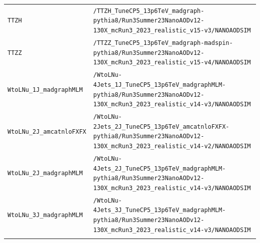 \begin{longtable}{@{}>{\RaggedRight\arraybackslash}p{} >{\RaggedRight\arraybackslash}p{}@{}}
\addlinespace[2pt]
\texttt{TTZH} & \texttt{/\allowbreak{}TTZH\_\allowbreak{}TuneCP5\_\allowbreak{}13p6TeV\_\allowbreak{}madgraph-\allowbreak{}pythia8/\allowbreak{}Run3Summer23NanoAODv12-\allowbreak{}130X\_\allowbreak{}mcRun3\_\allowbreak{}2023\_\allowbreak{}realistic\_\allowbreak{}v15-\allowbreak{}v3/\allowbreak{}NANOAODSIM} \\
\addlinespace[2pt]
\texttt{TTZZ} & \texttt{/\allowbreak{}TTZZ\_\allowbreak{}TuneCP5\_\allowbreak{}13p6TeV\_\allowbreak{}madgraph-\allowbreak{}madspin-\allowbreak{}pythia8/\allowbreak{}Run3Summer23NanoAODv12-\allowbreak{}130X\_\allowbreak{}mcRun3\_\allowbreak{}2023\_\allowbreak{}realistic\_\allowbreak{}v15-\allowbreak{}v4/\allowbreak{}NANOAODSIM} \\
\addlinespace[2pt]
\texttt{WtoLNu\_\allowbreak{}1J\_\allowbreak{}madgraphMLM} & \texttt{/\allowbreak{}WtoLNu-\allowbreak{}4Jets\_\allowbreak{}1J\_\allowbreak{}TuneCP5\_\allowbreak{}13p6TeV\_\allowbreak{}madgraphMLM-\allowbreak{}pythia8/\allowbreak{}Run3Summer23NanoAODv12-\allowbreak{}130X\_\allowbreak{}mcRun3\_\allowbreak{}2023\_\allowbreak{}realistic\_\allowbreak{}v14-\allowbreak{}v3/\allowbreak{}NANOAODSIM} \\
\addlinespace[2pt]
\texttt{WtoLNu\_\allowbreak{}2J\_\allowbreak{}amcatnloFXFX} & \texttt{/\allowbreak{}WtoLNu-\allowbreak{}2Jets\_\allowbreak{}2J\_\allowbreak{}TuneCP5\_\allowbreak{}13p6TeV\_\allowbreak{}amcatnloFXFX-\allowbreak{}pythia8/\allowbreak{}Run3Summer23NanoAODv12-\allowbreak{}130X\_\allowbreak{}mcRun3\_\allowbreak{}2023\_\allowbreak{}realistic\_\allowbreak{}v14-\allowbreak{}v2/\allowbreak{}NANOAODSIM} \\
\addlinespace[2pt]
\texttt{WtoLNu\_\allowbreak{}2J\_\allowbreak{}madgraphMLM} & \texttt{/\allowbreak{}WtoLNu-\allowbreak{}4Jets\_\allowbreak{}2J\_\allowbreak{}TuneCP5\_\allowbreak{}13p6TeV\_\allowbreak{}madgraphMLM-\allowbreak{}pythia8/\allowbreak{}Run3Summer23NanoAODv12-\allowbreak{}130X\_\allowbreak{}mcRun3\_\allowbreak{}2023\_\allowbreak{}realistic\_\allowbreak{}v14-\allowbreak{}v3/\allowbreak{}NANOAODSIM} \\
\addlinespace[2pt]
\texttt{WtoLNu\_\allowbreak{}3J\_\allowbreak{}madgraphMLM} & \texttt{/\allowbreak{}WtoLNu-\allowbreak{}4Jets\_\allowbreak{}3J\_\allowbreak{}TuneCP5\_\allowbreak{}13p6TeV\_\allowbreak{}madgraphMLM-\allowbreak{}pythia8/\allowbreak{}Run3Summer23NanoAODv12-\allowbreak{}130X\_\allowbreak{}mcRun3\_\allowbreak{}2023\_\allowbreak{}realistic\_\allowbreak{}v14-\allowbreak{}v3/\allowbreak{}NANOAODSIM} \\
\addlinespace[2pt]

\end{longtable}
